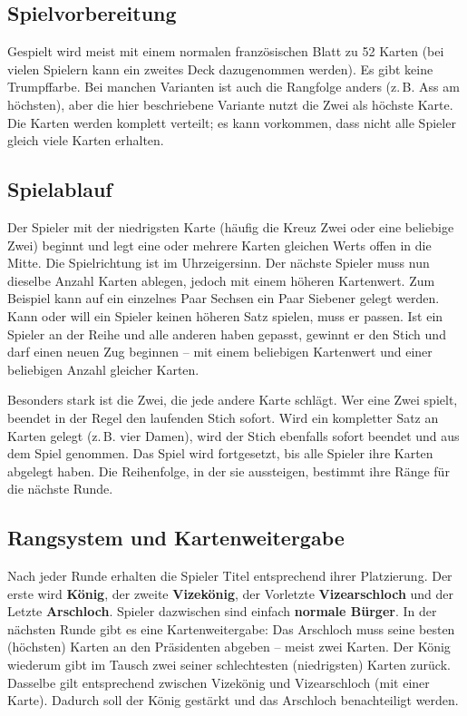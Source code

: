 \subsection*{Spielvorbereitung}

Gespielt wird meist mit einem normalen französischen Blatt zu 52 Karten (bei vielen Spielern kann ein zweites Deck dazugenommen werden). Es gibt keine Trumpffarbe.  Bei manchen Varianten ist auch die Rangfolge anders (z.\,B. Ass am höchsten), aber die hier beschriebene Variante nutzt die Zwei als höchste Karte. Die Karten werden komplett verteilt; es kann vorkommen, dass nicht alle Spieler gleich viele Karten erhalten.

\subsection*{Spielablauf}

Der Spieler mit der niedrigsten Karte (häufig die Kreuz Zwei oder eine beliebige Zwei) beginnt und legt eine oder mehrere Karten gleichen Werts offen in die Mitte. Die Spielrichtung ist im Uhrzeigersinn. Der nächste Spieler muss nun dieselbe Anzahl Karten ablegen, jedoch mit einem höheren Kartenwert. Zum Beispiel kann auf ein einzelnes Paar Sechsen ein Paar Siebener gelegt werden. Kann oder will ein Spieler keinen höheren Satz spielen, muss er passen. Ist ein Spieler an der Reihe und alle anderen haben gepasst, gewinnt er den Stich und darf einen neuen Zug beginnen – mit einem beliebigen Kartenwert und einer beliebigen Anzahl gleicher Karten.

Besonders stark ist die Zwei, die jede andere Karte schlägt. Wer eine Zwei spielt, beendet in der Regel den laufenden Stich sofort. Wird ein kompletter Satz an Karten gelegt (z.\,B. vier Damen), wird der Stich ebenfalls sofort beendet und aus dem Spiel genommen. Das Spiel wird fortgesetzt, bis alle Spieler ihre Karten abgelegt haben. Die Reihenfolge, in der sie aussteigen, bestimmt ihre Ränge für die nächste Runde.

\subsection*{Rangsystem und Kartenweitergabe}

Nach jeder Runde erhalten die Spieler Titel entsprechend ihrer Platzierung. Der erste wird \textbf{König}, der zweite \textbf{Vizekönig}, der Vorletzte \textbf{Vizearschloch} und der Letzte \textbf{Arschloch}. Spieler dazwischen sind einfach \textbf{normale Bürger}. In der nächsten Runde gibt es eine Kartenweitergabe: Das Arschloch muss seine besten (höchsten) Karten an den Präsidenten abgeben – meist zwei Karten. Der König wiederum gibt im Tausch zwei seiner schlechtesten (niedrigsten) Karten zurück. Dasselbe gilt entsprechend zwischen Vizekönig und Vizearschloch (mit einer Karte). Dadurch soll der König gestärkt und das Arschloch benachteiligt werden.

